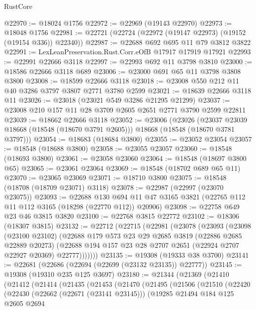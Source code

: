 \begin{lexlean}{RustCore}
\begin{coremodule}
@22970 := @18024 @1756
@22972 := @22969 (@19143 @22970)
@22973 := @18048 @1756
@22981 := @22721 (@22724 (@22972 (@19147 @22973) (@19152 (@19154 @336)) @22340))
@22987 := @22688 @692 @695 @11 @79 @3812 @3822
@22991 := LexLeanPreservation.Rust.Corr.eOfB @17917 @17919 @17921
@22993 := @22991 @22666 @3118
@22997 := @22993 @692 @11 @3798 @3810
@23000 := @18586 @22666 @3118 @689
@23006 := @23000 @691 @65 @11 @3798 @3808 @3800
@23008 := @18599 @22666 @3118
@23018 := @23008 @550 @212 @11 @40 @3286 @3797 @3807 @2771 @3780 @2599
@23021 := @18639 @22666 @3118 @11
@23026 := @23018 (@23021 @549 @3286 @21295 @21299)
@23037 := @23008 @210 @157 @11 @28 @3709 @2605 @2651 @2771 @3790 @2599 @22811
@23039 := @18662 @22666 @3118
@23052 := @23006
    (@23026
      (@23037 @23039 @18668 (@18548 (@18670 @3791 @2605)))
      @18668
      (@18548 (@18670 @3781 @3797)))
@23054 := @18683 (@18684 @3800)
@23055 := @23052 @23054
@23057 := @18548 (@18688 @3800)
@23058 := @23055 @23057
@23060 := @18548 (@18693 @3800)
@23061 := @23058 @23060
@23064 := @18548 (@18697 @3800 @65)
@23065 := @23061 @23064
@23069 := @18548 (@18702 @689 @65 @11)
@23070 := @23065 @23069
@23071 := @18710 @3800
@23075 := @18548 (@18708 (@18709 @23071) @3118)
@23078 := @22987 (@22997 (@23070 @23075))
@23093 := @22688
    @130
    @694
    @11
    @47
    @3165
    @3821
    (@22765 @112 @11 @112 @3165 (@18298 (@22770 @112)) @20906)
@23098 := @22758 @649 @23 @46 @3815 @3820
@23100 := @22768 @3815 @22772
@23102 := @18306 (@18307 @3815)
@23132 := @22712
    (@22715
      (@22981
        (@23078
          (@23093
            (@23098
              (@23100 @23102)
              (@22688
                @179
                @573
                @23
                @29
                @2685
                @3819
                (@22886 @2685 @22889 @20273)
                (@22688 @194 @157 @23 @28 @2707 @2651 (@22924 @2707 @22927 @20369) @22777)))))))
@23135 := @19308 (@19333 @38 @3700)
@23141 := @22681 (@22686 (@22694 (@22699 (@23132 @23135)) @22777))
@23145 := @19308 (@19310 @235 @125 @3697)
@23180 := @21344
    (@21369
      (@21410
        (@21412
          (@21414
            (@21435
              (@21453
                (@21470
                  (@21495
                    (@21506
                      (@21510
                        (@22420
                          (@22430
                            (@22662 (@22671 (@23141 @23145)))
                            (@19285
                              @21494
                              @184
                              @125
                              @2605
                              @2694

\end{coremodule}
\end{lexlean}
